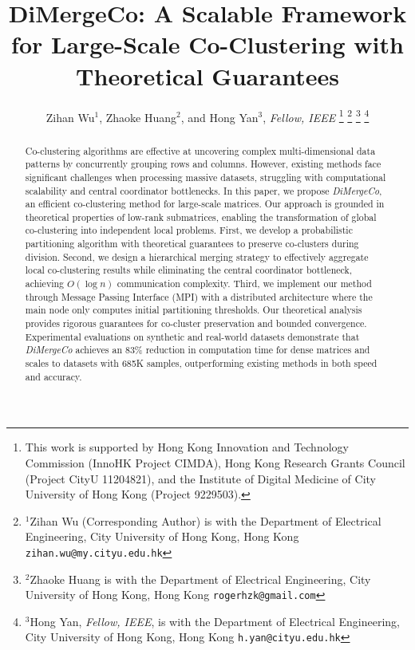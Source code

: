 \documentclass[journal]{IEEEtran}
\theoremstyle{definition}
\theoremstyle{remark} %
\begin{document}
\title{\LARGE \bf DiMergeCo: A Scalable Framework for Large-Scale Co-Clustering with Theoretical Guarantees}


\author{Zihan Wu$^{1}$, Zhaoke Huang$^{2}$, and Hong Yan$^{3}$, \textit{Fellow, IEEE}%
    \thanks{This work is supported by Hong Kong Innovation and
        Technology Commission (InnoHK Project CIMDA), Hong
        Kong Research Grants Council (Project CityU 11204821), and the Institute of Digital Medicine of City University of Hong Kong (Project 9229503). }%
    \thanks{$^{1}$Zihan Wu (Corresponding Author) is with the Department of Electrical Engineering,
        City University of Hong Kong, Hong Kong
            {\tt\small zihan.wu@my.cityu.edu.hk}}%
    \thanks{$^{2}$Zhaoke Huang is with the Department of Electrical Engineering,
        City University of Hong Kong, Hong Kong
            {\tt\small rogerhzk@gmail.com}}%
    \thanks{$^{3}$Hong Yan, \textit{Fellow, IEEE}, is with the Department of Electrical Engineering,
        City University of Hong Kong, Hong Kong
            {\tt\small h.yan@cityu.edu.hk}}%
}
\maketitle

\begin{abstract}
    Co-clustering algorithms are effective at uncovering complex multi-dimensional data patterns by concurrently grouping rows and columns. However, existing methods face significant challenges when processing massive datasets, struggling with computational scalability and central coordinator bottlenecks. In this paper, we propose \emph{DiMergeCo}, an efficient co-clustering method for large-scale matrices. Our approach is grounded in theoretical properties of low-rank submatrices, enabling the transformation of global co-clustering into independent local problems.  First, we develop a probabilistic partitioning algorithm with theoretical guarantees to preserve co-clusters during division. Second, we design a hierarchical merging strategy to effectively aggregate local co-clustering results while eliminating the central coordinator bottleneck, achieving $O(\log n)$ communication complexity. Third, we implement our method through Message Passing Interface (MPI) with a distributed architecture where the main node only computes initial partitioning thresholds.
    Our theoretical analysis provides rigorous guarantees for co-cluster preservation and bounded convergence. Experimental evaluations on synthetic and real-world datasets demonstrate that \emph{DiMergeCo} achieves an 83\% reduction in computation time for dense matrices and scales to datasets with 685K samples, outperforming existing methods in both speed and accuracy.
\end{abstract}
\end{document}
